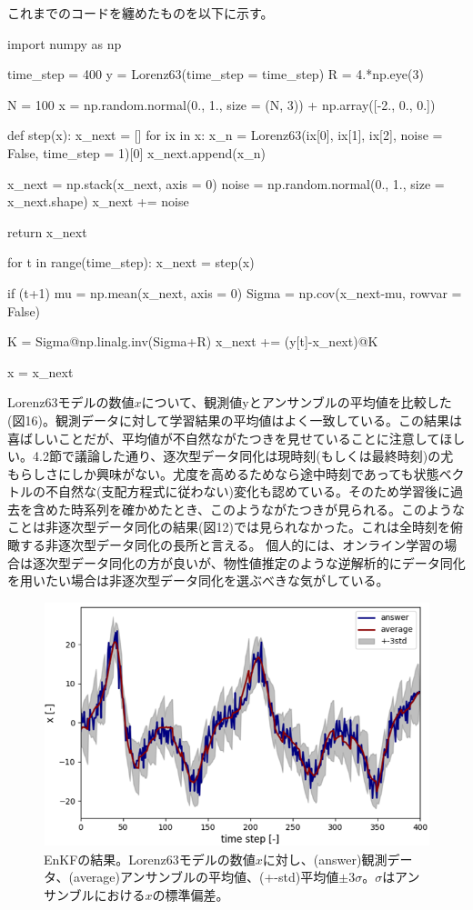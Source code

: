 \documentclass[dvipdfmx, 9pt, a4paper]{jsarticle}
\begin{document}
これまでのコードを纏めたものを以下に示す。\bigskip
\begin{python}
import numpy as np

time_step = 400
y = Lorenz63(time_step = time_step)
R = 4.*np.eye(3)

N = 100
x = np.random.normal(0., 1., size = (N, 3)) + np.array([-2., 0., 0.])

def step(x):
	x_next = []
	for ix in x:
		x_n = Lorenz63(ix[0], ix[1], ix[2], noise = False, time_step = 1)[0]
		x_next.append(x_n)

	x_next = np.stack(x_next, axis = 0)
	noise = np.random.normal(0., 1., size = x_next.shape)
	x_next += noise

	return x_next

for t in range(time_step):
	x_next = step(x)

	if (t+1)%
		mu = np.mean(x_next, axis = 0)
		Sigma = np.cov(x_next-mu, rowvar = False)

		K = Sigma@np.linalg.inv(Sigma+R)
		x_next += (y[t]-x_next)@K

	x = x_next
\end{python}\bigskip \par
Lorenz63モデルの数値$x$について、観測値yとアンサンブルの平均値を比較した(図16)。観測データに対して学習結果の平均値はよく一致している。この結果は喜ばしいことだが、平均値が不自然ながたつきを見せていることに注意してほしい。4.2節で議論した通り、逐次型データ同化は現時刻(もしくは最終時刻)の尤もらしさにしか興味がない。尤度を高めるためなら途中時刻であっても状態ベクトルの不自然な(支配方程式に従わない)変化も認めている。そのため学習後に過去を含めた時系列を確かめたとき、このようながたつきが見られる。このようなことは非逐次型データ同化の結果(図12)では見られなかった。これは全時刻を俯瞰する非逐次型データ同化の長所と言える。
個人的には、オンライン学習の場合は逐次型データ同化の方が良いが、物性値推定のような逆解析的にデータ同化を用いたい場合は非逐次型データ同化を選ぶべきな気がしている。

\begin{figure}[t]
\begin{center}
\includegraphics[width=12cm]{"fig16.png"}
\caption{EnKFの結果。Lorenz63モデルの数値$x$に対し、(answer)観測データ、(average)アンサンブルの平均値、(+-std)平均値$\pm 3\sigma$。$\sigma$はアンサンブルにおける$x$の標準偏差。}
\end{center}
\end{figure}
\end{document}
